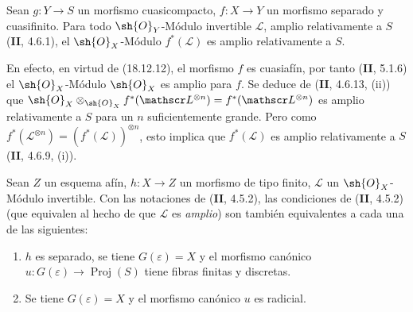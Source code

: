 \begin{proposition}[18.12.16]
\label{IV.18.12.16}
Sean $g:Y\to S$ un morfismo cuasicompacto, $f:X\to Y$ un morfismo separado y cuasifinito. Para todo $\sh{O}_Y$-Módulo invertible $\mathscr L$, amplio relativamente a $S$ \textup{(\textbf{II}, 4.6.1)}, el $\sh{O}_X$-Módulo $f^*(\mathscr L)$ es amplio relativamente a $S$.
\end{proposition}

En efecto, en virtud de (18.12.12), el morfismo $f$ es cuasiafín, por tanto (\textbf{II}, 5.1.6) el $\sh{O}_X$-Módulo $\sh{O}_X$ es amplio para $f$. Se deduce de (\textbf{II}, 4.6.13, (ii)) que
$\sh{O}_X\otimes_{\sh{O}_X}f^*(\mathscr L^{\otimes n})=f^*(\mathscr L^{\otimes n})$
es amplio relativamente a $S$ para un $n$ suficientemente grande. Pero como $f^*(\mathscr L^{\otimes n})=(f^*(\mathscr L))^{\otimes n}$, esto implica que $f^*(\mathscr L)$ es amplio relativamente a $S$ (\textbf{II}, 4.6.9, (i)).

\begin{corollary}[18.12.17]
\label{IV.18.12.17}
Sean $Z$ un esquema afín, $h:X\to Z$ un morfismo de tipo finito, $\mathscr L$ un $\sh{O}_X$-Módulo invertible. Con las notaciones de \textup{(\textbf{II}, 4.5.2)}, las condiciones de \textup{(\textbf{II}, 4.5.2)} \textup{(que equivalen al hecho de que $\mathscr L$ es \emph{amplio})} son también equivalentes a cada una de las siguientes:
\begin{enumerate}
  \item[\textup{b$''$)}] $h$ es separado, se tiene $G(\varepsilon)=X$ y el morfismo canónico $u:G(\varepsilon)\to\operatorname{Proj}(S)$ tiene fibras finitas y discretas.
  \item[\textup{b$'''$)}] Se tiene $G(\varepsilon)=X$ y el morfismo canónico $u$ es radicial.
\end{enumerate}
\end{corollary}

